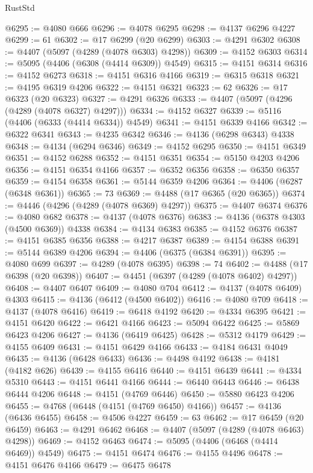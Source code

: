 \begin{lexlean}{RustStd}
\begin{coremodule}
{\begin{coremodule}
{{{{{{{{{{{{{{{{{{{{{{{{{{{{{{{{{{{{{{{{{{{{{{{{{{@6295 := @4080 @666
@6296 := @4078 @6295
@6298 := @4137 @6296 @4227
@6299 := 61
@6302 := @17 @6299 (@20 @6299)
@6303 := @4291 @6302
@6308 := @4407 (@5097 (@4289 (@4078 @6303) @4298))
@6309 := @4152 @6303
@6314 := @5095 (@4406 (@6308 (@4414 @6309)) @4549)
@6315 := @4151 @6314
@6316 := @4152 @6273
@6318 := @4151 @6316 @4166
@6319 := @6315 @6318
@6321 := @4195 @6319 @4206
@6322 := @4151 @6321
@6323 := 62
@6326 := @17 @6323 (@20 @6323)
@6327 := @4291 @6326
@6333 := @4407 (@5097 (@4296 (@4289 (@4078 @6327) @4297)))
@6334 := @4152 @6327
@6339 := @5116 (@4406 (@6333 (@4414 @6334)) @4549)
@6341 := @4151 @6339 @4166
@6342 := @6322 @6341
@6343 := @4235 @6342
@6346 := @4136 (@6298 @6343) @4338
@6348 := @4134 (@6294 @6346)
@6349 := @4152 @6295
@6350 := @4151 @6349
@6351 := @4152 @6288
@6352 := @4151 @6351
@6354 := @5150 @4203 @4206
@6356 := @4151 @6354 @4166
@6357 := @6352 @6356
@6358 := @6350 @6357
@6359 := @4154 @6358
@6361 := @5144 @6359 @4206
@6364 := @4406 (@6287 (@6348 @6361))
@6365 := 73
@6369 := @4488 (@17 @6365 (@20 @6365))
@6374 := @4446 (@4296 (@4289 (@4078 @6369) @4297))
@6375 := @4407 @6374
@6376 := @4080 @682
@6378 := @4137 (@4078 @6376)
@6383 := @4136 (@6378 @4303 (@4500 @6369)) @4338
@6384 := @4134 @6383
@6385 := @4152 @6376
@6387 := @4151 @6385 @6356
@6388 := @4217 @6387
@6389 := @4154 @6388
@6391 := @5144 @6389 @4206
@6394 := @4406 (@6375 (@6384 @6391))
@6395 := @4080 @699
@6397 := @4289 (@4078 @6395)
@6398 := 74
@6402 := @4488 (@17 @6398 (@20 @6398))
@6407 := @4451 (@6397 (@4289 (@4078 @6402) @4297))
@6408 := @4407 @6407
@6409 := @4080 @704
@6412 := @4137 (@4078 @6409) @4303
@6415 := @4136 (@6412 (@4500 @6402))
@6416 := @4080 @709
@6418 := @4137 (@4078 @6416)
@6419 := @6418 @4192
@6420 := @4334 @6395
@6421 := @4151 @6420
@6422 := @6421 @4166
@6423 := @5094 @6422
@6425 := @5869 @6423 @4206
@6427 := @4136 (@6419 @6425)
@6428 := @5312 @4179
@6429 := @4155 @6409
@6431 := @4151 @6429 @4166
@6433 := @4184 @6431 @4049
@6435 := @4136 (@6428 @6433)
@6436 := @4498 @4192
@6438 := @4181 (@4182 @626)
@6439 := @4155 @6416
@6440 := @4151 @6439
@6441 := @4334 @5310
@6443 := @4151 @6441 @4166
@6444 := @6440 @6443
@6446 := @6438 @6444 @4206
@6448 := @4151 (@4769 @6446)
@6450 := @5880 @6423 @4206
@6455 := @4768 (@6448 (@4151 (@4769 @6450) @4166))
@6457 := @4136 (@6436 @6455)
@6458 := @4506 @4227
@6459 := 63
@6462 := @17 @6459 (@20 @6459)
@6463 := @4291 @6462
@6468 := @4407 (@5097 (@4289 (@4078 @6463) @4298))
@6469 := @4152 @6463
@6474 := @5095 (@4406 (@6468 (@4414 @6469)) @4549)
@6475 := @4151 @6474
@6476 := @4155 @4496
@6478 := @4151 @6476 @4166
@6479 := @6475 @6478
}}}}}}}}}}}}}}}}}}}}}}}}}}}}}}}}}}}}}}}}}}}}}}}}}}
\end{coremodule}}
\end{coremodule}
\end{lexlean}
